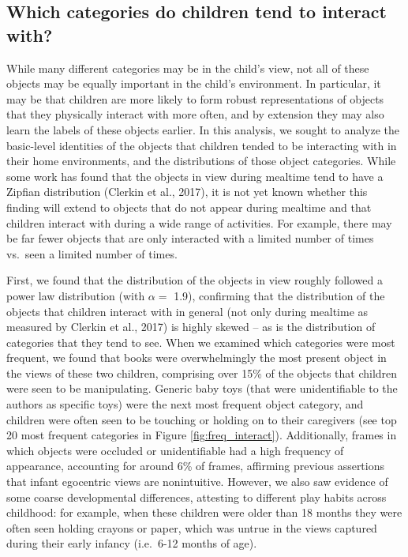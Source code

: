 \documentclass[10pt, letterpaper]{article}
\begin{document}
\hypertarget{which-categories-do-children-tend-to-interact-with}{%
\subsection{Which categories do children tend to interact
with?}\label{which-categories-do-children-tend-to-interact-with}}

While many different categories may be in the child's view, not all of
these objects may be equally important in the child's environment. In
particular, it may be that children are more likely to form robust
representations of objects that they physically interact with more
often, and by extension they may also learn the labels of these objects
earlier. In this analysis, we sought to analyze the basic-level
identities of the objects that children tended to be interacting with in
their home environments, and the distributions of those object
categories. While some work has found that the objects in view during
mealtime tend to have a Zipfian distribution (Clerkin et al., 2017), it
is not yet known whether this finding will extend to objects that do not
appear during mealtime and that children interact with during a wide
range of activities. For example, there may be far fewer objects that
are only interacted with a limited number of times vs.~seen a limited
number of times.

First, we found that the distribution of the objects in view roughly
followed a power law distribution (with \(\alpha =\) 1.9), confirming
that the distribution of the objects that children interact with in
general (not only during mealtime as measured by Clerkin et al., 2017)
is highly skewed -- as is the distribution of categories that they tend
to see. When we examined which categories were most frequent, we found
that books were overwhelmingly the most present object in the views of
these two children, comprising over 15\% of the objects that children
were seen to be manipulating. Generic baby toys (that were
unidentifiable to the authors as specific toys) were the next most
frequent object category, and children were often seen to be touching or
holding on to their caregivers (see top 20 most frequent categories in
Figure \ref{fig:freq_interact}). Additionally, frames in which objects
were occluded or unidentifiable had a high frequency of appearance,
accounting for around 6\% of frames, affirming previous assertions that
infant egocentric views are nonintuitive. However, we also saw evidence
of some coarse developmental differences, attesting to different play
habits across childhood: for example, when these children were older
than 18 months they were often seen holding crayons or paper, which was
untrue in the views captured during their early infancy (i.e.~6-12
months of age).
\end{document}
